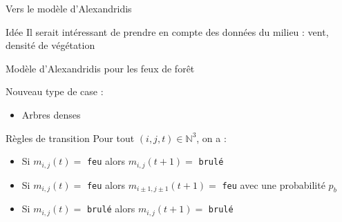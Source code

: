 \documentclass{beamer}
\begin{document}
\begin{frame}{Vers le modèle d'Alexandridis \hyperlink{jump}{\beamerbutton{ }} \hypertarget{6}{\beamerbutton{ }}}
    \begin{block}{Idée}
        Il serait intéressant de prendre en compte des données du milieu : vent, densité de végétation
    \end{block}
\end{frame}

\begin{frame}{Modèle d'Alexandridis pour les feux de forêt \hyperlink{jump}{\beamerbutton{ }} \hypertarget{7}{\beamerbutton{ }}}
    \begin{block}{Nouveau type de case :}
        \begin{itemize}
            \item Arbres denses
        \end{itemize}
    \end{block}

    \hspace{1cm}

    \begin{block}{Règles de transition}
        Pour tout $(i,j,t) \in \mathbb{N}^3$, on a :
        \begin{itemize}
            \item Si $m_{i,j} (t) = $ \texttt{feu} alors $m_{i,j} (t+1) = $ \texttt{brulé}
            \item Si $m_{i,j} (t) = $ \texttt{feu} alors $m_{i \pm 1,j \pm 1} (t+1) = $ \texttt{feu} avec une probabilité $p_b$
            \item Si $m_{i,j} (t) = $ \texttt{brulé} alors $m_{i,j} (t+1) = $ \texttt{brulé}
        \end{itemize}
    \end{block}
\end{frame}
\end{document}
